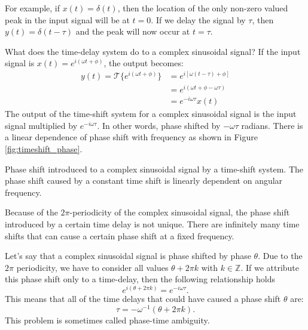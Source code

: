 For example, if $x(t)=\delta(t)$, then the location of the only non-zero valued peak in the input signal will be at $t=0$. If we delay the signal by $\tau$, then $y(t)=\delta(t-\tau)$ and the peak will now occur at $t=\tau$.

What does the time-delay system do to a complex sinusoidal signal? If the input signal is $x(t) = e^{i(\omega t + \phi)}$, the output becomes:
\begin{align}
y(t) = \mathcal{T}\{e^{i(\omega t + \phi)}\} &= e^{i[\omega (t-\tau) + \phi]}\\
&=  e^{i(\omega t + \phi - \omega \tau)}\\
&=  e^{-i\omega \tau}x(t)
\end{align}
The output of the time-shift system for a complex sinusoidal signal is
the input signal multiplied by $e^{-i\omega \tau}$. In other words,
phase shifted by $-\omega \tau$ radians. There is a linear dependence
of phase shift with frequency as shown in
Figure \ref{fig:timeshift_phase}.

\begin{marginfigure}
\begin{center}
\end{center}
\caption{Phase shift introduced to a complex sinusoidal signal by a time-shift system. The phase shift caused by a constant time shift is linearly dependent on angular frequency.}
\label{fig:timeshift_phase}
\end{marginfigure}

Because of the $2\pi$-periodicity of the complex sinusoidal signal,
the phase shift introduced by a certain time delay is not
unique. There are infinitely many time shifts that can cause a certain
phase shift at a fixed frequency.

Let's say that a complex sinusoidal signal is phase shifted by phase
$\theta$. Due to the $2\pi$ periodicity, we have to consider all
values $\theta + 2\pi k$ with $k\in\mathbb{Z}$. If we attribute this
phase shift only to a time-delay, then the following relationship holds
\begin{equation}
e^{i (\theta+2\pi k)} = e^{-i \omega \tau}.
\end{equation}
This means that all of the time delays that could have caused a phase shift $\theta$ are:
\begin{equation}
\tau = -\omega^{-1}(\theta+2\pi k).
\end{equation}
This problem is sometimes called phase-time ambiguity.

